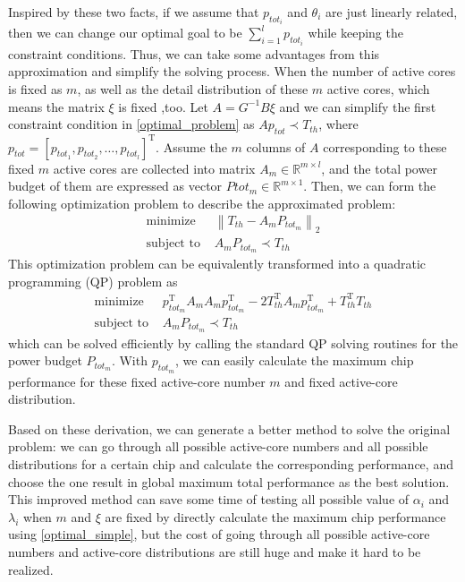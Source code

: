 Inspired by these two facts, if we assume that $p_{tot_{i}}$ and $\theta_i$ are just linearly related, then we can change our optimal goal to be $\sum_{i=1}^l p_{tot_{i}}$ 
while keeping the constraint conditions. 
Thus, we can take some advantages from this approximation and simplify the solving process. When the number of active cores is fixed as $m$, as well as the detail 
distribution of these $m$ active cores, which means the matrix $\xi$ is fixed ,too. 
Let $A=G^{-1} B \xi$ and we can simplify the first constraint condition in \eqref{optimal_problem} as $A p_{tot} \prec T_{th}$, where $p_{tot}=[p_{{tot}_{1}},p_{{tot}_{2}},\ldots,p_{{tot}_{l}}]^ \mathrm{ T }$.
Assume the $m$ columns of $A$ corresponding to these fixed $m$ active cores are collected into matrix $A_m \in \mathbb{R}^{m \times l}$, and the total 
power budget of them are expressed as vector $P{{tot}_m} \in \mathbb{R}^{m \times 1}$. Then, we can form the following optimization problem to describe the approximated problem:
\begin{equation}
\begin{split}
\text{minimize} \,\, &\left\|T_{th}-A_m P_{{tot}_m}\right\|_2 \\
\text{subject to}\,\, &A_m P_{{tot}_m} \prec T_{th}
\end{split}
\end{equation}
This optimization problem can be equivalently transformed into a quadratic programming (QP) problem as
\begin{equation}\label{optimal_simple}
\begin{split}
\text{minimize} \,\, &p_{{tot}_m}^\mathrm{T} A_m A_m p_{{tot}_m}^\mathrm{T}-2 T_{th}^\mathrm{T} A_m p_{{tot}_m}^\mathrm{T} + T_{th}^\mathrm{T} T_{th}  \\
\text{subject to}\,\, &A_m P_{{tot}_m} \prec T_{th}
\end{split}
\end{equation}
which can be solved efficiently by calling the standard QP solving routines for the power budget $P_{{tot}_m}$. With $p_{{tot}_m}$, we can 
easily calculate the maximum chip performance for these fixed active-core number $m$ and fixed active-core distribution. 

Based on these derivation, we can generate a better method to solve the original problem: we can go through all possible active-core numbers and all possible 
distributions for a certain chip and calculate the corresponding performance, and choose the one result in global maximum total performance as the best 
solution. This improved method can save some time of testing all possible value of $\alpha_i$ and $\lambda_i$ when $m$ and $\xi$ are fixed by directly 
calculate the maximum chip performance using \eqref{optimal_simple}, but the cost of going through all possible active-core numbers and active-core distributions 
are still huge and make it hard to be realized.     

